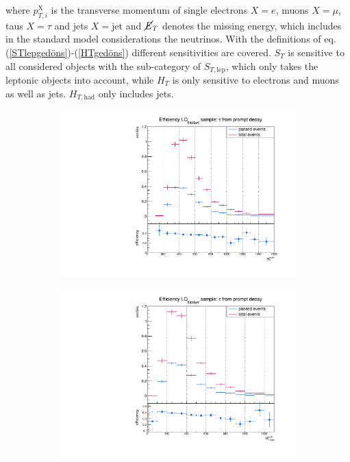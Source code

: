 where $p_{T,i}^\text{X}$ is the transverse momentum of single electrons $X=e$, muons $X=\mu$, taus $X=\tau$ and jets $X=\text{jet}$ and $\cancel{E}_{T}$ denotes the missing energy, which includes in the standard model considerations the neutrinos. With the definitions of eq. (\ref{STlepgedöns})-(\ref{HTgedöns}) different sensitivities are covered. $S_T$ is sensitive to all considered objects with the sub-category of $S_{T,\text{lep}}$, which only takes the leptonic objects into account, while $H_{T}$ is only sensitive to electrons and muons as well as jets. $H_{T,\text{had}}$ only includes jets.\par
\begin{figure}
  \centering
                \begin{subfigure}[t]{0.49\textwidth}
                \includegraphics[width=\textwidth]{figures/plots/ttH/Divided_promptHT.pdf}
                \label{Divided:prompt:HT}
                \end{subfigure}
                \begin{subfigure}[t]{0.49\textwidth}
                \includegraphics[width=\textwidth]{figures/plots/ttH/Divided_promptHThad.pdf}

\end{subfigure}
\end{figure}

